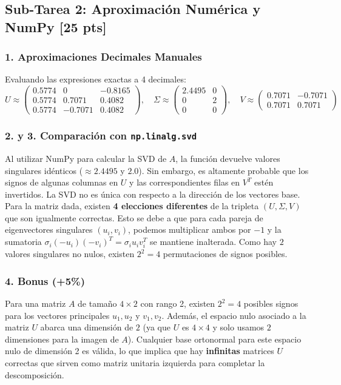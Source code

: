 \documentclass[12pt]{article}
\begin{document}
\subsection*{Sub-Tarea 2: Aproximación Numérica y NumPy [25 pts]}
\subsubsection*{1. Aproximaciones Decimales Manuales}
Evaluando las expresiones exactas a 4 decimales:
\begin{equation}
    U \approx \begin{pmatrix} 0.5774 & 0 & -0.8165 \\ 0.5774 & 0.7071 & 0.4082 \\ 0.5774 & -0.7071 & 0.4082 \end{pmatrix}, \quad \Sigma \approx \begin{pmatrix} 2.4495 & 0 \\ 0 & 2 \\ 0 & 0 \end{pmatrix}, \quad V \approx \begin{pmatrix} 0.7071 & -0.7071 \\ 0.7071 & 0.7071 \end{pmatrix}
\end{equation}

\subsubsection*{2. y 3. Comparación con \texttt{np.linalg.svd}}
Al utilizar NumPy para calcular la SVD de $A$, la función devuelve valores singulares idénticos ($\approx 2.4495$ y $2.0$). Sin embargo, es altamente probable que los signos de algunas columnas en $U$ y las correspondientes filas en $V^T$ estén invertidos. 
La SVD no es única con respecto a la dirección de los vectores base. Para la matriz dada, existen \textbf{4 elecciones diferentes} de la tripleta $(U, \Sigma, V)$ que son igualmente correctas. Esto se debe a que para cada pareja de eigenvectores singulares $(u_i, v_i)$, podemos multiplicar ambos por $-1$ y la sumatoria $\sigma_i (-u_i) (-v_i)^T = \sigma_i u_i v_i^T$ se mantiene inalterada. Como hay $2$ valores singulares no nulos, existen $2^2 = 4$ permutaciones de signos posibles.

\subsubsection*{4. Bonus (+5\%)}
Para una matriz $A$ de tamaño $4 \times 2$ con rango 2, existen $2^2 = 4$ posibles signos para los vectores principales $u_1, u_2$ y $v_1, v_2$. Además, el espacio nulo asociado a la matriz $U$ abarca una dimensión de $2$ (ya que $U$ es $4 \times 4$ y solo usamos $2$ dimensiones para la imagen de $A$). Cualquier base ortonormal para este espacio nulo de dimensión 2 es válida, lo que implica que hay \textbf{infinitas} matrices $U$ correctas que sirven como matriz unitaria izquierda para completar la descomposición.
\end{document}
